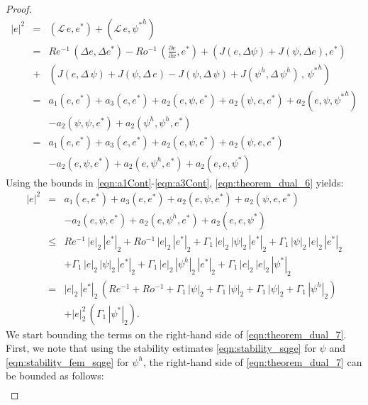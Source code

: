 \begin{proof}
\begin{eqnarray}
|e|^2
&=& (\mathcal{L} \, e , e^*)
+ (\mathcal{L} \, e , {\psi^*}^h)
\nonumber \\
&=& Re^{-1} \, (\Delta e , \Delta e^*)
- Ro^{-1} \, \left( \frac{\partial e}{\partial x} , e^* \right)
+ \left(
J(e , \Delta \psi)
+ J(\psi , \Delta e)
, e^*
\right)
\nonumber \\
&+& \left(
 J(e , \Delta \, \psi)
+ J(\psi , \Delta \, e)
- J(\psi , \Delta \, \psi)
+ J(\psi^h , \Delta \, \psi^h)
 \, , \,
{\psi^*}^h
\right)
\nonumber \\
&=& a_1(e , e^*)
+ a_3(e , e^*)
+ a_2(e , \psi , e^*)
+ a_2(\psi , e, e^*)
+ a_2(e , \psi , {\psi^*}^h)
\nonumber \\
&& - a_2(\psi , \psi , e^*)
+ a_2(\psi^h , \psi^h , e^*)
\nonumber \\
&=& a_1(e , e^*)
+ a_3(e , e^*)
+ a_2(e , \psi , e^*)
+ a_2(\psi , e, e^*)
\nonumber \\
&& - a_2(e , \psi , e^*)
+ a_2(e , \psi^h , e^*)
+ a_2(e , e , \psi^*)
\label{eqn:theorem_dual_6}
\end{eqnarray}
Using the bounds in \eqref{eqn:a1Cont}-\eqref{eqn:a3Cont}, \eqref{eqn:theorem_dual_6} yields:
\begin{eqnarray}
|e|^2
&=& a_1(e , e^*)
+ a_3(e , e^*)
+ a_2(e , \psi , e^*)
+ a_2(\psi , e, e^*)
\nonumber \\
&& - a_2(e , \psi , e^*)
+ a_2(e , \psi^h , e^*)
+ a_2(e , e , \psi^*)
\nonumber \\
&\leq& Re^{-1} \, | e |_2 \, |e^* |_2
+ Ro^{-1} \, | e |_2 \, |e^* |_2
+ \Gamma_1 \, | e |_2 \, | \psi |_2 \, | e^* |_2
+ \Gamma_1 \, | \psi |_2 \, | e |_2 \, | e^* |_2
\nonumber \\
&& + \Gamma_1 \, | e |_2 \, | \psi |_2 \, | e^* |_2
+ \Gamma_1 \, | e |_2 \, | \psi^h |_2 \, | e^* |_2
+ \Gamma_1 \, | e |_2 \, | e |_2 \, | \psi^* |_2
\nonumber \\
&=& | e |_2 \, |e^* |_2 \,
\left(
Re^{-1}
+ Ro^{-1}
+ \Gamma_1 \, | \psi |_2
+ \Gamma_1 \, | \psi |_2
+ \Gamma_1 \, | \psi |_2
+ \Gamma_1 \, | \psi^h |_2
\right)
\nonumber \\
&& + | e |_2^2 \,
\left(
\Gamma_1 \, | \psi^* |_2
\right) .
\label{eqn:theorem_dual_7}
\end{eqnarray}
We start bounding the terms on the right-hand side of \eqref{eqn:theorem_dual_7}.
First, we note that using the stability estimates \eqref{eqn:stability_sqge} for $\psi$ and \eqref{eqn:stability_fem_sqge} for $\psi^h$, the right-hand side of \eqref{eqn:theorem_dual_7} can be bounded as follows:
\begin{eqnarray}

\end{eqnarray}
\end{proof}
